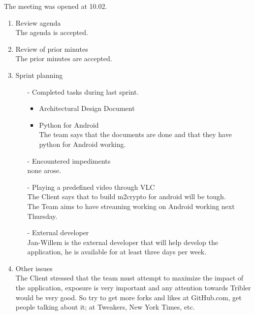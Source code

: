 \documentclass[pdftex, 12pt, a4paper]{report}
\begin{document}
\pagestyle{fancy}

The meeting was opened at 10.02.\\
\begin{enumerate}
\item Review agenda	\\
The agenda is accepted.\\		
\item Review of prior minutes\\
The prior minutes are accepted.\\		
\item Sprint planning
\begin{enumerate}
\item[-] Completed tasks during last sprint.\\
	\begin{itemize}
	\item Architectural Design Document\\

	\item Python for Android\\
The team says that the documents are done and that they have python for Android working.
	\end{itemize}
\item[-] Encountered impediments\\
none arose.\\
\item[-] Playing a predefined video through VLC\\
The Client says that to build m2crypto for android will be tough.\\
The Team aims to have streaming working on Android working next Thursday.\\
\item[-] External developer\\
Jan-Willem is the external developer that will help develop the application, he is available for at least three days per week.

\end{enumerate}
\item Other issues\\
The Client stressed that the team must attempt to maximize the impact of the application, exposure is very important and any attention towards Tribler would be very good. So try to get more forks and likes at GitHub.com, get people talking about it; at Tweakers, New York Times, etc. \\


\end{enumerate}
\end{document}
